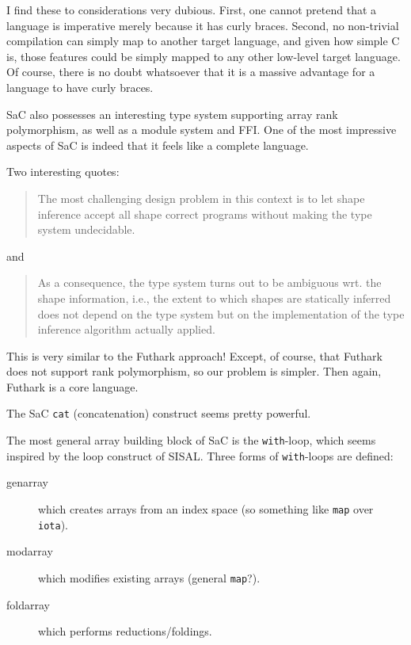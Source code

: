 \documentclass[a4paper, oneside, final]{memoir}
\begin{document}
I find these to considerations very dubious.  First, one cannot
pretend that a language is imperative merely because it has curly
braces.  Second, no non-trivial compilation can simply map to another
target language, and given how simple C is, those features could be
simply mapped to any other low-level target language.  Of course,
there is no doubt whatsoever that it is a massive advantage for a
language to have curly braces.

SaC also possesses an interesting type system supporting array rank
polymorphism, as well as a module system and FFI.  One of the most
impressive aspects of SaC is indeed that it feels like a complete
language.

Two interesting quotes:

\begin{quote}
  The most challenging design problem in this context is to let shape
  inference accept all shape correct programs without making the type
  system undecidable.
\end{quote}

and

\begin{quote}
  As a consequence, the type system turns out to be ambiguous wrt. the
  shape information, i.e., the extent to which shapes are statically
  inferred does not depend on the type system but on the
  implementation of the type inference algorithm actually applied.
\end{quote}

This is very similar to the Futhark approach!  Except, of course, that
Futhark does not support rank polymorphism, so our problem is simpler.
Then again, Futhark is a core language.

The SaC \texttt{cat} (concatenation) construct seems pretty powerful.

The most general array building block of SaC is the
\texttt{with}-loop, which seems inspired by the loop construct of
SISAL.  Three forms of \texttt{with}-loops are defined:

\begin{description}
\item[genarray] which creates arrays from an index space (so something
  like \texttt{map} over \texttt{iota}).
\item[modarray] which modifies existing arrays (general \texttt{map}?).
\item[foldarray] which performs reductions/foldings.
\end{description}
\end{document}
